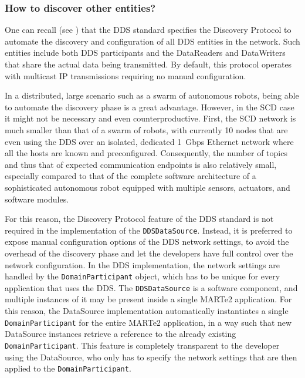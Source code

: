 \subsubsection{How to discover other entities?}
\label{sec:ddsdatasource_discovery}
One can recall (see ) that the DDS standard specifies the Discovery Protocol to automate the discovery and configuration of all DDS entities in the network. Such entities include both DDS participants and the DataReaders and DataWriters that share the actual data being transmitted. By default, this protocol operates with multicast IP transmissions requiring no manual configuration.

In a distributed, large scenario such as a swarm of autonomous robots, being able to automate the discovery phase is a great advantage. However, in the SCD case it might not be necessary and even counterproductive. First, the SCD network is much smaller than that of a swarm of robots, with currently 10 nodes that are even using the DDS over an isolated, dedicated \SI{1}{Gbps} Ethernet network where all the hosts are known and preconfigured. Consequently, the number of topics and thus that of expected communication endpoints is also relatively small, especially compared to that of the complete software architecture of a sophisticated autonomous robot equipped with multiple sensors, actuators, and software modules.

For this reason, the Discovery Protocol feature of the DDS standard is not required in the implementation of the \texttt{DDSDataSource}. Instead, it is preferred to expose manual configuration options of the DDS network settings, to avoid the overhead of the discovery phase and let the developers have full control over the network configuration. In the DDS implementation, the network settings are handled by the \texttt{DomainParticipant} object, which has to be unique for every application that uses the DDS. The \texttt{DDSDataSource} is a software component, and multiple instances of it may be present inside a single MARTe2 application. For this reason, the DataSource implementation automatically instantiates a single \texttt{DomainParticipant} for the entire MARTe2 application, in a way such that new DataSource instances retrieve a reference to the already existing \texttt{DomainParticipant}. This feature is completely transparent to the developer using the DataSource, who only has to specify the network settings that are then applied to the \texttt{DomainParticipant}.

